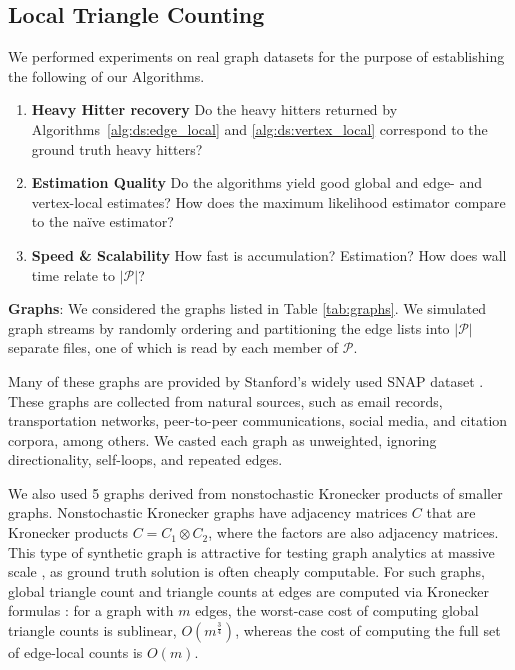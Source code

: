 \documentclass[10]{report}
\begin{document}
\subsection{Local Triangle Counting}
 \label{DS:sec:experiments:triangles}

We performed experiments on real graph datasets for the purpose of establishing the following of our Algorithms.
\begin{enumerate}
	\item \textbf{Heavy Hitter recovery	} Do the heavy hitters returned by Algorithms~\ref{alg:ds:edge_local} and \ref{alg:ds:vertex_local} correspond to the ground truth heavy hitters?
	\item \textbf{Estimation Quality} Do the algorithms yield good global and edge- and vertex-local estimates? How does the maximum likelihood estimator compare to the na\"ive estimator?
	\item \textbf{Speed \& Scalability} How fast is accumulation? Estimation? How does wall time relate to $|\mathcal{P}|$?
\end{enumerate}



\noindent
\textbf{Graphs}: 
We considered the graphs listed in Table \ref{tab:graphs}.
We simulated graph streams by randomly ordering and partitioning the edge lists into $|\mathcal{P}|$ separate files, one of which is read by each member of $\mathcal{P}$.

Many of these graphs are provided by Stanford's widely used SNAP dataset \cite{snapnets}.
These graphs are collected from natural sources, such as email records, transportation networks, peer-to-peer communications, social media, and citation corpora, among others.
We casted each graph as unweighted, ignoring directionality, self-loops, and repeated edges. 

We also used 5 graphs derived from nonstochastic Kronecker products of smaller graphs.
Nonstochastic Kronecker graphs \cite{weichsel1962kronecker} have adjacency matrices $C$ that are Kronecker products $C = C_1 \otimes C_2$, where the factors are also adjacency matrices.
This type of synthetic graph is attractive for testing graph analytics at massive scale \cite{leskovec2010kronecker, kepner2018design}, as ground truth solution is often cheaply computable.
For such graphs, global triangle count and triangle counts at edges are computed via Kronecker formulas \cite{sanders2018large}: for a graph with $m$ edges, the worst-case cost of computing global triangle counts is sublinear, $O \left ( m^{\frac{3}{4}} \right )$, whereas the cost of computing the full set of edge-local counts is $O \left ( m \right )$.
\end{document}
